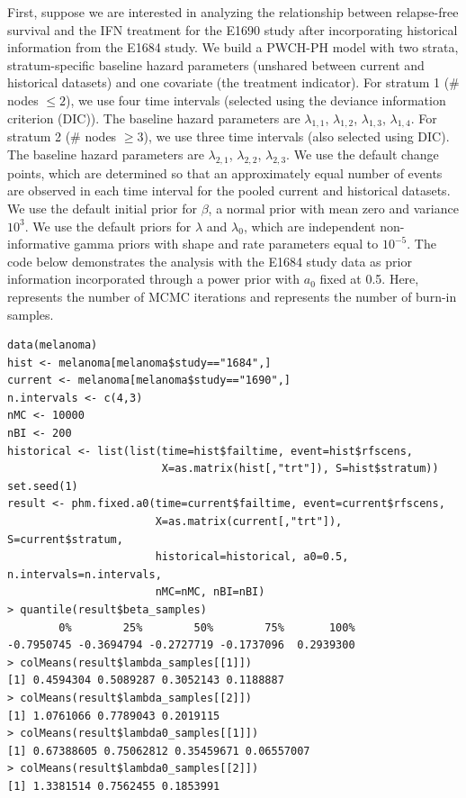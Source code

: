 First, suppose we are interested in analyzing the relationship between relapse-free survival and the IFN treatment for the E1690 study after incorporating historical information from the E1684 study. We build a PWCH-PH model with two strata, stratum-specific baseline hazard parameters (unshared between current and historical datasets) and one covariate (the treatment indicator). For stratum 1 (\# nodes $\le 2$), we use four time intervals (selected using the deviance information criterion (DIC)). The baseline hazard parameters are $\lambda_{1,1}$, $\lambda_{1,2}$, $\lambda_{1,3}$, $\lambda_{1,4}$. For stratum 2 (\# nodes $\ge 3$), we use three time intervals (also selected using DIC). The baseline hazard parameters are $\lambda_{2,1}$, $\lambda_{2,2}$, $\lambda_{2,3}$. We use the default change points, which are determined so that an approximately equal number of events are observed in each time interval for the pooled current and historical datasets. We use the default initial prior for $\beta$, a normal prior with mean zero and variance $10^3$. We use the default priors for $\lambda$ and $\lambda_0$, which are independent non-informative gamma priors with shape and rate parameters equal to $10^{-5}$. The code below demonstrates the analysis with the E1684 study data as prior information incorporated through a
power prior with $a_0$ fixed at 0.5. Here,  represents the number of MCMC iterations and  represents the number of burn-in samples.

\begin{verbatim}
data(melanoma)
hist <- melanoma[melanoma$study=="1684",]
current <- melanoma[melanoma$study=="1690",]
n.intervals <- c(4,3)
nMC <- 10000
nBI <- 200
historical <- list(list(time=hist$failtime, event=hist$rfscens, 
                        X=as.matrix(hist[,"trt"]), S=hist$stratum))
set.seed(1)
result <- phm.fixed.a0(time=current$failtime, event=current$rfscens, 
                       X=as.matrix(current[,"trt"]), S=current$stratum, 
                       historical=historical, a0=0.5, n.intervals=n.intervals, 
                       nMC=nMC, nBI=nBI)
> quantile(result$beta_samples)
        0%        25%        50%        75%       100% 
-0.7950745 -0.3694794 -0.2727719 -0.1737096  0.2939300 
> colMeans(result$lambda_samples[[1]])
[1] 0.4594304 0.5089287 0.3052143 0.1188887
> colMeans(result$lambda_samples[[2]])
[1] 1.0761066 0.7789043 0.2019115
> colMeans(result$lambda0_samples[[1]])
[1] 0.67388605 0.75062812 0.35459671 0.06557007
> colMeans(result$lambda0_samples[[2]])
[1] 1.3381514 0.7562455 0.1853991

\end{verbatim}

